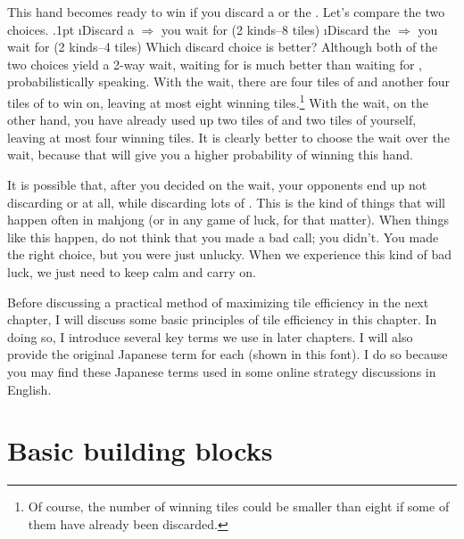 \bigskip
\noindent
This hand becomes ready to win if you discard a {\large{}} or the {\large{}}. Let's compare the two choices.
\bi\itemsep.1pt
\i Discard a {\large{}} \hfill $\Rightarrow$ you wait for {\large{} } (2 kinds--8 tiles)
\i Discard the {\large{}} \hfill $\Rightarrow$ you wait for {\large{}} {\large{}} (2 kinds--4 tiles)
\ei
Which discard choice is better? Although both of the two choices yield a 2-way wait, waiting for {\large{} } is much better than waiting for {\large{}} {\large{}}, probabilistically speaking. With the {\large{} } wait, there are four tiles of {\large{}} and another four tiles of {\large{}} to win on, leaving at most eight winning tiles.\footnote{Of course, the number of winning tiles could be smaller than eight if some of them have already been discarded.} 
With the {\large{}} {\large{}} wait, on the other hand, you have already used up two tiles of {\large{}} and two tiles of {\large{}} yourself, leaving at most four winning tiles. It is clearly better to choose the {\large{} } wait over the {\large{}} {\large{}} wait, because that will give you a higher probability of winning this hand. 

\bigskip
It is possible that, after you decided on the {\large{} } wait, your opponents end up not discarding {\large{}} or {\large{}} at all, while discarding lots of {\large{} }. This is the kind of things that will happen often in mahjong (or in any game of luck, for that matter). When things like this happen, do not think that you made a bad call; you didn't. You made the right choice, but you were just unlucky. When we experience this kind of bad luck, we just need to keep calm and carry on. 

\bigskip
Before discussing a practical method of maximizing tile efficiency in the next chapter, I will discuss some basic principles of tile efficiency in this chapter. In doing so, I introduce several key terms we use in later chapters. I will also provide the original Japanese term for each (shown in {\jap this font}). I do so because you may find these Japanese terms used in some online strategy discussions in English.

\section{Basic building blocks}

